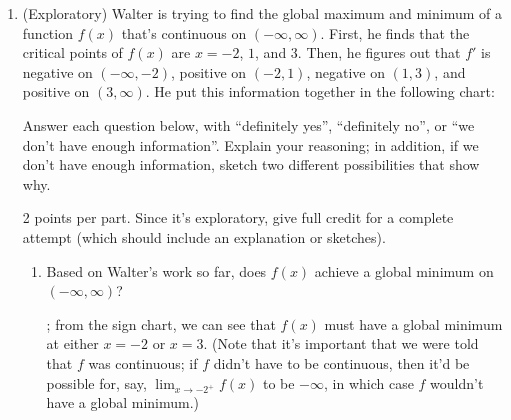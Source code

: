 \documentclass{article}
\begin{document}
\begin{enumerate}
\item \label{critical-points-reasoning-1}

  (Exploratory) Walter is trying to find the global maximum and minimum of a  function $f(x)$ that's continuous on $(-\infty, \infty)$. First, he finds that the critical points of $f(x)$ are $x = -2$, $1$, and $3$. Then, he figures out that $f'$ is negative on $(-\infty, -2)$, positive on $(-2, 1)$, negative on $(1, 3)$, and positive on $(3, \infty)$. He put this information together in the following chart:
  \begin{center}
  \end{center}

  Answer each question below, with ``definitely yes'', ``definitely no'', or ``we don't have enough information''. Explain your reasoning; in addition, if we don't have enough information, sketch two different possibilities that show why.

  \begin{grading}
    2 points per part. Since it's exploratory, give full credit for a complete attempt (which should include an explanation or sketches). 
  \end{grading}

  \begin{enumerate}
  \item
    \begin{problem}[\vfill\newpage]
      Based on Walter's work so far, does $f(x)$ achieve a global
      minimum on $(-\infty, \infty)$?
    \end{problem}

    \begin{solution} 
      ; from the sign chart, we can see that $f(x)$ must have a global minimum at either $x = -2$ or $x = 3$. (Note that it's important that we were told that $f$ was continuous; if $f$ didn't have to be continuous, then it'd be possible for, say, $\displaystyle \lim_{x \to -2^+} f(x)$ to be $-\infty$, in which case $f$ wouldn't have a global minimum.)
    \end{solution}


\end{enumerate}
\end{enumerate}
\end{document}
